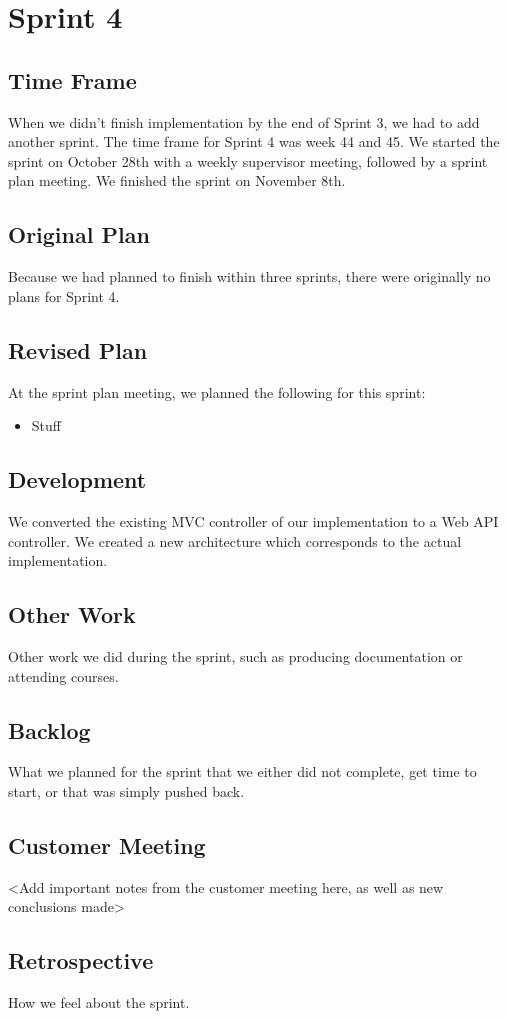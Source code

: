 \section{Sprint 4}

\subsection{Time Frame}
When we didn't finish implementation by the end of Sprint 3, we had to add another sprint. The time frame for Sprint 4 was week 44 and 45. We started the sprint on October 28th with a weekly supervisor meeting, followed by a sprint plan meeting. We finished the sprint on November 8th.

\subsection{Original Plan}
Because we had planned to finish within three sprints, there were originally no plans for Sprint 4.

\subsection{Revised Plan}
At the sprint plan meeting, we planned the following for this sprint:
\begin{itemize}
	\item Stuff
\end{itemize}

\subsection{Development}
We converted the existing MVC controller of our implementation to a Web API controller.
We created a new architecture which corresponds to the actual implementation.

\subsection{Other Work}
Other work we did during the sprint, such as producing documentation or attending courses.

\subsection{Backlog}
What we planned for the sprint that we either did not complete, get time to start, or that was simply pushed back.

\subsection{Customer Meeting}
<Add important notes from the customer meeting here, as well as new conclusions made>

\subsection{Retrospective}
How we feel about the sprint.